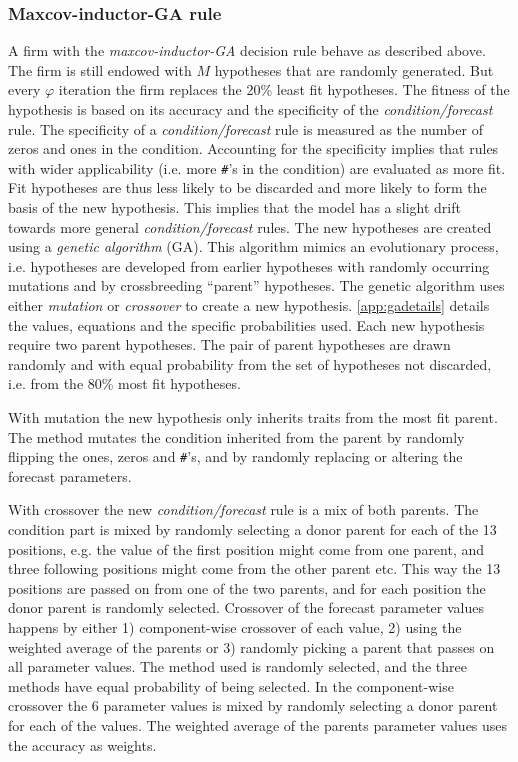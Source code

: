 \documentclass[preprint, 12pt]{elsarticle}
\begin{document}
\subsubsection{Maxcov-inductor-GA rule}

A firm with the \emph{maxcov-inductor-GA} decision rule behave as described above. The firm is still endowed with $M$ hypotheses that are randomly generated. But every $\varphi$ iteration the firm replaces the 20\% least fit hypotheses. The fitness of the hypothesis is based on its accuracy and the specificity of the \emph{condition/forecast} rule. The specificity of a \emph{condition/forecast} rule is measured as the number of zeros and ones in the condition. Accounting for the specificity implies that rules with wider applicability (i.e. more \texttt{\#}'s in the condition) are evaluated as more fit. Fit hypotheses are thus less likely to be discarded and more likely to form the basis of the new hypothesis. This implies that the model has a slight drift towards more general \emph{condition/forecast} rules. The new hypotheses are created using a \emph{genetic algorithm} (GA). This algorithm mimics an evolutionary process, i.e. hypotheses are developed from earlier hypotheses with randomly occurring mutations and by crossbreeding ``parent'' hypotheses. The genetic algorithm uses either \emph{mutation} or \emph{crossover} to create a new hypothesis. \ref{app:gadetails} details the values, equations and the specific probabilities used. Each new hypothesis require two parent hypotheses. The pair of parent hypotheses are drawn randomly and with equal probability from the set of hypotheses not discarded, i.e. from the 80\% most fit hypotheses. 

With mutation the new hypothesis only inherits traits from the most fit parent. The method mutates the condition inherited from the parent by randomly flipping the ones, zeros and \texttt{\#}'s, and by randomly replacing or altering the forecast parameters. 

With crossover the new \emph{condition/forecast} rule is a mix of both parents. The condition part is mixed by randomly selecting a donor parent for each of the 13 positions, e.g. the value of the first position might come from one parent, and three following positions might come from the other parent etc. This way the 13 positions are passed on from one of the two parents, and for each position the donor parent is randomly selected. Crossover of the forecast parameter values happens by either 1) component-wise crossover of each value, 2) using the weighted average of the parents or 3) randomly picking a parent that passes on all parameter values. The method used is randomly selected, and the three methods have equal probability of being selected. In the component-wise crossover the 6 parameter values is mixed by randomly selecting a donor parent for each of the values. The weighted average of the parents parameter values uses the accuracy as weights.
\end{document}
